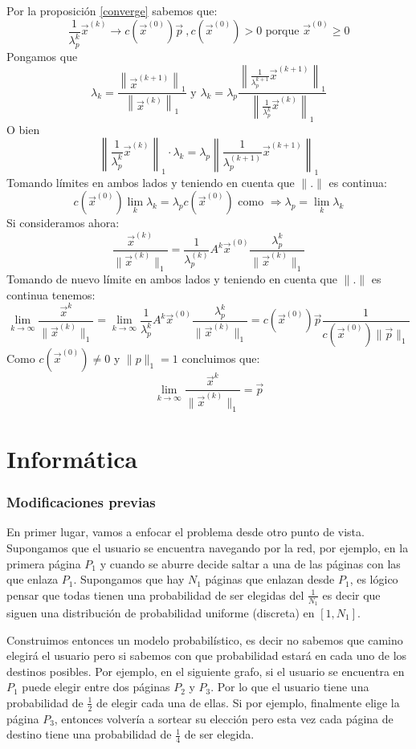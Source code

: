 \documentclass[size=a4, parskip=half, titlepage=false, toc=flat, toc=bib, 12pt]{scrartcl}
\theoremstyle{theorem-style}
\theoremstyle{definition-style}
\theoremstyle{remark-style}
\theoremstyle{example-style}
\theoremstyle{definition-style}
\theoremstyle{remark-style}
\begin{document}
Por la proposición \ref{converge} sabemos que:
$$\frac{1}{\lambda_p^k} \vec{x}^{(k)} \rightarrow c(\vec{x}^{(0)})\vec{p} \ , c(\vec{x}^{(0)}) > 0 \textrm{ porque } \vec{x}^{(0)} \geq 0$$
Pongamos que
$$\lambda_k = \frac{\left\|\vec{x}^{(k+1)}\right\|_1}{\left\|\vec{x}^{(k)}\right\|_1} \textrm{ y } \lambda_k = \lambda_p \frac{\left\|\frac{1}{\lambda_p^{k+1}} \vec{x}^{(k+1)}\right\|_1}{\left\|\frac{1}{\lambda_p^k} \vec{x}^{(k)}\right\|_1}$$
O bien
$$\left\|\frac{1}{\lambda_p^k} \vec{x}^{(k)} \right\|_1 \cdot \lambda_k  = \lambda_p \left\| \frac{1}{\lambda_p^{(k+1)}} \vec{x}^{(k+1)} \right\|_1$$
Tomando límites en ambos lados y teniendo en cuenta que $\|.\|$ es continua:
$$c(\vec{x}^{(0)}) \lim_{k} \lambda_k = \lambda_p c(\vec{x}^{(0)}) \textrm{ como }  \Rightarrow \lambda_p = \lim_{k} \lambda_k $$
Si consideramos ahora:
$$\frac{\vec{x}^{(k)}}{\|\vec{x}^{(k)}\|_1} = \frac{1}{\lambda_p^{(k)}} A^k \vec{x}^{(0)} \frac{\lambda_p^k}{\|\vec{x}^{(k)}\|_1} $$
Tomando de nuevo límite en ambos lados y teniendo en cuenta que $\|. \|$ es continua tenemos:
$$\lim_{k \to \infty} \frac{\vec{x}^k}{\|\vec{x}^{(k)}\|_1} = \lim_{k \to \infty} \frac{1}{\lambda_p^k} A^k \vec{x}^{(0)} \frac{\lambda_p^k}{\|\vec{x}^{(k)}\|_1} = c(\vec{x}^{(0)}) \vec{p} \frac{1}{c(\vec{x}^{(0)}) \|\vec{p}\|_1} $$
Como $c(\vec{x}^{(0)}) \neq 0$ y $\|p \|_1 = 1$ concluimos que:
$$\lim_{k \to \infty} \frac{\vec{x}^k}{\|\vec{x}^{(k)}\|_1} = \vec{p} $$


\newpage

\part{Informática}

\section{Modificaciones previas}

En primer lugar, vamos a enfocar el problema desde otro punto de vista. Supongamos que el usuario se encuentra navegando por la red, por ejemplo, en la primera página $P_1$ y cuando se aburre decide saltar a una de las páginas con las que enlaza $P_1$. Supongamos que hay $N_1$ páginas que enlazan desde $P_1$, es lógico pensar que todas tienen una probabilidad de ser elegidas del $\frac{1}{N_1}$ es decir que siguen una distribución de probabilidad uniforme (discreta) en $[1, N_1]$.

Construimos entonces un modelo probabilístico, es decir no sabemos que camino elegirá el usuario pero si sabemos con que probabilidad estará en cada uno de los destinos posibles. Por ejemplo, en el siguiente grafo, si el usuario se encuentra en $P_1$ puede elegir entre dos páginas $P_2$ y $P_3$. Por lo que el usuario tiene una probabilidad de $\frac{1}{2}$ de elegir cada una de ellas. Si por ejemplo, finalmente elige la página $P_3$, entonces volvería a sortear su elección pero esta vez cada página de destino tiene una probabilidad de $\frac{1}{4}$ de ser elegida.
\end{document}
